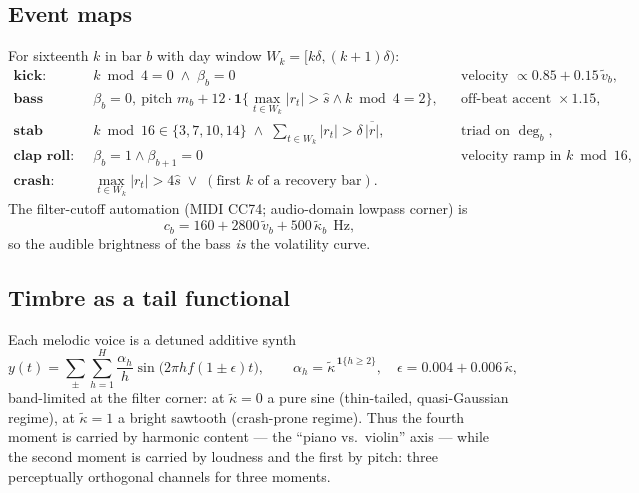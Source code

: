 \documentclass[11pt,a4paper]{article}
\newcommand{\ind}{\mathbf{1}}
\begin{document}
\subsection{Event maps}

For sixteenth $k$ in bar $b$ with day window $W_k = [k\delta, (k+1)\delta)$:
\begin{align*}
\textbf{kick:}\quad & k \bmod 4 = 0 \;\wedge\; \beta_b = 0
&& \text{velocity } \propto 0.85 + 0.15\,\tilde v_b,\\
\textbf{bass note:}\quad & \beta_b = 0,\ \text{pitch } m_b + 12\cdot
\ind\{\max_{t\in W_k}|r_t| > \hat s \wedge k\bmod4=2\},
&& \text{off-beat accent } \times 1.15,\\
\textbf{stab (chord):}\quad & k\bmod16 \in \{3,7,10,14\} \;\wedge\;
\textstyle\sum_{t \in W_k}|r_t| > \delta\,\overline{|r|},
&& \text{triad on } \deg_b,\\
\textbf{clap roll:}\quad & \beta_b = 1 \wedge \beta_{b+1} = 0
&& \text{velocity ramp in } k\bmod 16,\\
\textbf{crash:}\quad & \max_{t\in W_k} |r_t| > 4\hat s
\;\vee\; (\text{first } k \text{ of a recovery bar}). &&
\end{align*}
The filter-cutoff automation (MIDI CC74; audio-domain lowpass corner) is
\begin{equation}
c_b = 160 + 2800\,\tilde v_b + 500\,\tilde\kappa_b \ \ \text{Hz},
\end{equation}
so the audible brightness of the bass \emph{is} the volatility curve.

\subsection{Timbre as a tail functional}

Each melodic voice is a detuned additive synth
\begin{equation}
y(t) = \sum_{\pm} \sum_{h=1}^{H} \frac{\alpha_h}{h}
\sin\!\bigl(2\pi h f (1\pm\epsilon) t\bigr), \qquad
\alpha_h = \tilde\kappa^{\,\ind\{h\ge2\}},\quad
\epsilon = 0.004 + 0.006\,\tilde\kappa,
\end{equation}
band-limited at the filter corner: at $\tilde\kappa=0$ a pure sine (thin-tailed,
quasi-Gaussian regime), at $\tilde\kappa=1$ a bright sawtooth (crash-prone
regime). Thus the fourth moment is carried by harmonic content --- the
``piano vs.\ violin'' axis --- while the second moment is carried by loudness
and the first by pitch: three perceptually orthogonal channels for three moments.
\end{document}
